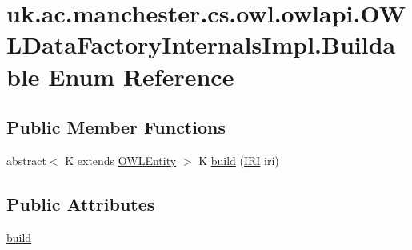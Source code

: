 \hypertarget{enumuk_1_1ac_1_1manchester_1_1cs_1_1owl_1_1owlapi_1_1_o_w_l_data_factory_internals_impl_1_1_buildable}{\section{uk.\-ac.\-manchester.\-cs.\-owl.\-owlapi.\-O\-W\-L\-Data\-Factory\-Internals\-Impl.\-Buildable Enum Reference}
\label{enumuk_1_1ac_1_1manchester_1_1cs_1_1owl_1_1owlapi_1_1_o_w_l_data_factory_internals_impl_1_1_buildable}
}
\subsection*{Public Member Functions}
\begin{DoxyCompactItemize}
\item 
abstract$<$ K extends \hyperlink{interfaceorg_1_1semanticweb_1_1owlapi_1_1model_1_1_o_w_l_entity}{O\-W\-L\-Entity} $>$ K \hyperlink{enumuk_1_1ac_1_1manchester_1_1cs_1_1owl_1_1owlapi_1_1_o_w_l_data_factory_internals_impl_1_1_buildable_a360fa6300cce58584b26a6a38874f364}{build} (\hyperlink{classorg_1_1semanticweb_1_1owlapi_1_1model_1_1_i_r_i}{I\-R\-I} iri)
\end{DoxyCompactItemize}
\subsection*{Public Attributes}
\begin{DoxyCompactItemize}
\item 
\hyperlink{enumuk_1_1ac_1_1manchester_1_1cs_1_1owl_1_1owlapi_1_1_o_w_l_data_factory_internals_impl_1_1_buildable_ab4e724148d055b48ee022f857e8868c2}{build}
\end{DoxyCompactItemize}


